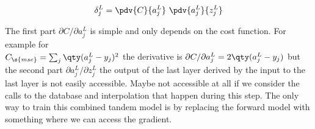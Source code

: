 \begin{equation}
    \delta^L_j = \pdv{C}{a^L_j} \ \pdv{a^L_j}{z^L_j}
\end{equation}

The first part $\partial C / \partial{a^L_j}$ is simple and only depends on the cost function. For example for \\
$C_\s{mse} = \sum_j \qty(a_j^L - y_j)^2$
the derivative is 
$\partial{C} / \partial{a^L_j} = 2 \qty(a_j^L - y_j)$
but the second part 
$\partial{a^L_j} / \partial{z^L_j}$
the output of the last layer derived by the input to the last layer is not easily accessible. Maybe not accessible at all if we consider the calls to the database and interpolation that happen during this step. The only way to train this combined tandem model is by replacing the forward model with something where we can access the gradient.
